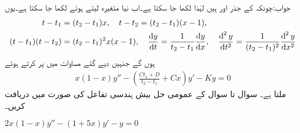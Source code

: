 جواب:چونکہ  کے جذر  اور  ہیں لہٰذا  لکھا جا سکتا ہے۔اب نیا متغیرہ  لیتے ہوئے  لکھا جا سکتا ہے۔یوں
\begin{align*}
t-t_1&=(t_2-t_1)x,\quad t-t_2=(t_2-t_1)(x-1),\\
(t-t_1)(t-t_2)&=(t_2-t_1)^2x(x-1),\quad \frac{\dif y}{\dif t}=\frac{1}{t_2-t_1}\frac{\dif y}{\dif x},\quad \frac{\dif^{\, 2} y}{\dif t^2}=\frac{1}{(t_2-t_1)^2}\frac{\dif^{\,2} y}{\dif x^2}
\end{align*}
ہوں گے جنہیں دیے گئے مساوات میں پر کرتے ہوئے
\begin{align}
x(1-x)y''-\left(\frac{Ct_1+D}{t_2-t_1}+Cx\right)y'-Ky=0
\end{align}
ملتا ہے۔
سوال  تا سوال  کے عمومی حل بیش ہندسی تفاعل کی صورت میں دریافت کریں۔

\quad
$2x(1-x)y''-(1+5x)y'-y=0$\\

